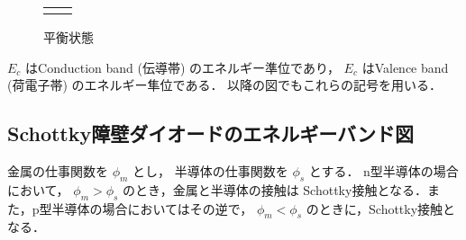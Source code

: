                     \begin{figure}[htbp]
                        \begin{tabular}{cc}
                            \begin{minipage}{0.5\hsize}
                                \begin{center}
                                    {semi_con_bunri.pdf}
                                    \caption{接合前}
                                    \label{fig:semi_con_bunri}
                                \end{center}
                            \end{minipage}
                            \begin{minipage}{0.5\hsize}
                                \begin{center}
                                    {semi_con_ketugou.pdf}
                                    \caption{平衡状態}
                                    \label{fig:semi_con_ketugou}
                                \end{center}
                            \end{minipage}
                        \end{tabular}
                    \end{figure}

        $E_{c}$ はConduction band (伝導帯) のエネルギー準位であり，
        $E_{c}$ はValence band (荷電子帯) のエネルギー隼位である．
        以降の図でもこれらの記号を用いる．


    \newpage

        \subsection{Schottky障壁ダイオードのエネルギーバンド図}
        金属の仕事関数を $\phi_{m}$ とし，
        半導体の仕事関数を $\phi_{s}$ とする．
        n型半導体の場合において，
        $\phi_{m}>\phi_{s}$ のとき，金属と半導体の接触は
        Schottky接触となる．また，p型半導体の場合においてはその逆で，
        $\phi_{m}<\phi_{s}$ のときに，Schottky接触となる．

